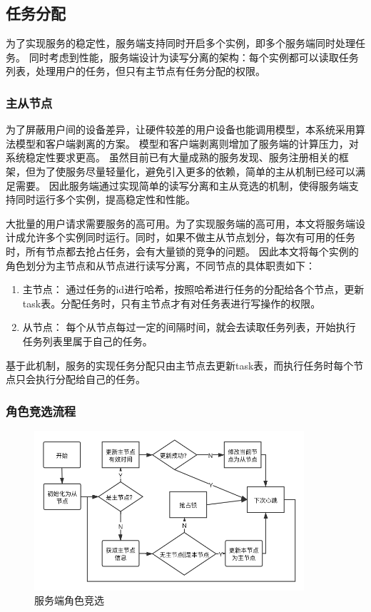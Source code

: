 \subsection{任务分配}
为了实现服务的稳定性，服务端支持同时开启多个实例，即多个服务端同时处理任务。
同时考虑到性能，服务端设计为读写分离的架构：每个实例都可以读取任务列表，处理用户的任务，但只有主节点有任务分配的权限。


\subsubsection{主从节点}
为了屏蔽用户间的设备差异，让硬件较差的用户设备也能调用模型，本系统采用算法模型和客户端剥离的方案。
模型和客户端剥离则增加了服务端的计算压力，对系统稳定性要求更高。
虽然目前已有大量成熟的服务发现、服务注册相关的框架，但为了使服务尽量轻量化，避免引入更多的依赖，简单的主从机制已经可以满足需要。
因此服务端通过实现简单的读写分离和主从竞选的机制，使得服务端支持同时运行多个实例，提高稳定性和性能。


大批量的用户请求需要服务的高可用。为了实现服务端的高可用，本文将服务端设计成允许多个实例同时运行。同时，如果不做主从节点划分，每次有可用的任务时，所有节点都去抢占任务，会有大量锁的竞争的问题。
因此本文将每个实例的角色划分为主节点和从节点进行读写分离，不同节点的具体职责如下：

\begin{enumerate}
    \item 主节点： 通过任务的id进行哈希，按照哈希进行任务的分配给各个节点，更新task表。分配任务时，只有主节点才有对任务表进行写操作的权限。

    \item 从节点： 每个从节点每过一定的间隔时间，就会去读取任务列表，开始执行任务列表里属于自己的任务。  

\end{enumerate}

基于此机制，服务的实现任务分配只由主节点去更新task表，而执行任务时每个节点只会执行分配给自己的任务。

\subsubsection{角色竞选流程}

\begin{figure}
    \centering
    \includegraphics[width=10cm]{images/slave-master.png}
    \caption{服务端角色竞选}
    \label{fig:slave_master}
\end{figure}

